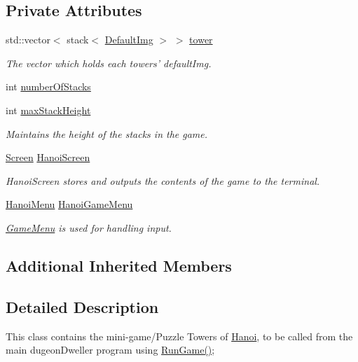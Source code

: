 \subsection*{Private Attributes}
\begin{DoxyCompactItemize}
\item 
std\-::vector$<$ stack$<$ \hyperlink{classDefaultImg}{Default\-Img} $>$ $>$ \hyperlink{classHanoi_afe67c656c8ce8c7006e8b7f23fbe9ae9}{tower}
\begin{DoxyCompactList}\small\item\em The vector which holds each towers' default\-Img. \end{DoxyCompactList}\item 
int \hyperlink{classHanoi_abcdaa5a4b56f9c3916bf49e054e1cf8c}{number\-Of\-Stacks}
\item 
int \hyperlink{classHanoi_a826f3bc786cb5c7b6499508d0b8bc9b4}{max\-Stack\-Height}
\begin{DoxyCompactList}\small\item\em Maintains the height of the stacks in the game. \end{DoxyCompactList}\item 
\hyperlink{classScreen}{Screen} \hyperlink{classHanoi_a1b9bfd6a0428f772d78b66a5a3268c4c}{Hanoi\-Screen}
\begin{DoxyCompactList}\small\item\em Hanoi\-Screen stores and outputs the contents of the game to the terminal. \end{DoxyCompactList}\item 
\hyperlink{classHanoiMenu}{Hanoi\-Menu} \hyperlink{classHanoi_a7d73005d59c4f2134ffd564964ab3f49}{Hanoi\-Game\-Menu}
\begin{DoxyCompactList}\small\item\em \hyperlink{classGameMenu}{Game\-Menu} is used for handling input. \end{DoxyCompactList}\end{DoxyCompactItemize}
\subsection*{Additional Inherited Members}


\subsection{Detailed Description}
This class contains the mini-\/game/\-Puzzle Towers of \hyperlink{classHanoi}{Hanoi}, to be called from the main dugeon\-Dweller program using \hyperlink{classHanoi_a294a2a533b7f3305391aa880f7a0eb36}{Run\-Game()}; 


